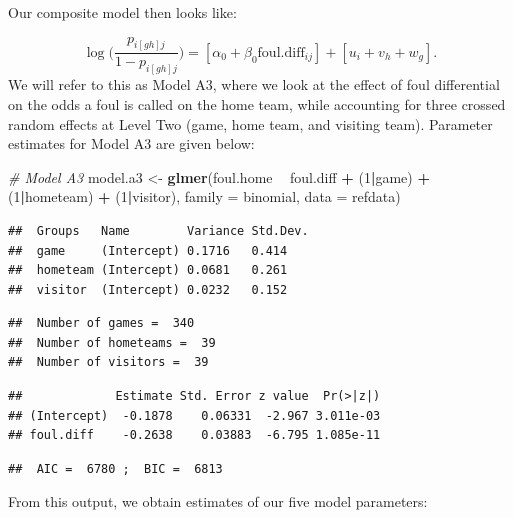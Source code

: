 \documentclass[
]{krantz}
\newenvironment{Shaded}{\begin{snugshade}}{\end{snugshade}}
\newcommand{\CommentTok}[1]{\textcolor[rgb]{0.37,0.37,0.37}{\textit{#1}}}
\newcommand{\DataTypeTok}[1]{\textcolor[rgb]{0.27,0.27,0.27}{#1}}
\newcommand{\DecValTok}[1]{\textcolor[rgb]{0.06,0.06,0.06}{#1}}
\newcommand{\KeywordTok}[1]{\textcolor[rgb]{0.27,0.27,0.27}{\textbf{#1}}}
\newcommand{\NormalTok}[1]{#1}
\newcommand{\OperatorTok}[1]{\textcolor[rgb]{0.43,0.43,0.43}{\textbf{#1}}}
\newcommand{\StringTok}[1]{\textcolor[rgb]{0.5,0.5,0.5}{#1}}
\begin{document}
Our composite model then looks like:

\begin{equation*}
\log\bigg(\frac{p_{i[gh]j}}{1-p_{i[gh]j}}\bigg) = [\alpha_{0}+\beta_{0}\mathrm{foul.diff}_{ij}]+[u_{i}+v_{h}+w_{g}].
\end{equation*}
We will refer to this as Model A3, where we look at the effect of foul differential on the odds a foul is called on the home team, while accounting for three crossed random effects at Level Two (game, home team, and visiting team). Parameter estimates for Model A3 are given below:

\begin{Shaded}
\begin{Highlighting}[]
\CommentTok{# Model A3}
\NormalTok{model.a3 <-}\StringTok{ }\KeywordTok{glmer}\NormalTok{(foul.home }\OperatorTok{~}\StringTok{ }\NormalTok{foul.diff }\OperatorTok{+}\StringTok{ }\NormalTok{(}\DecValTok{1}\OperatorTok{|}\NormalTok{game) }\OperatorTok{+}\StringTok{ }
\StringTok{    }\NormalTok{(}\DecValTok{1}\OperatorTok{|}\NormalTok{hometeam) }\OperatorTok{+}\StringTok{ }\NormalTok{(}\DecValTok{1}\OperatorTok{|}\NormalTok{visitor), }
    \DataTypeTok{family =}\NormalTok{ binomial, }\DataTypeTok{data =}\NormalTok{ refdata)}
\end{Highlighting}
\end{Shaded}

\begin{verbatim}
##  Groups   Name        Variance Std.Dev.
##  game     (Intercept) 0.1716   0.414   
##  hometeam (Intercept) 0.0681   0.261   
##  visitor  (Intercept) 0.0232   0.152
\end{verbatim}

\begin{verbatim}
##  Number of games =  340 
##  Number of hometeams =  39 
##  Number of visitors =  39
\end{verbatim}

\begin{verbatim}
##             Estimate Std. Error z value  Pr(>|z|)
## (Intercept)  -0.1878    0.06331  -2.967 3.011e-03
## foul.diff    -0.2638    0.03883  -6.795 1.085e-11
\end{verbatim}

\begin{verbatim}
##  AIC =  6780 ;  BIC =  6813
\end{verbatim}

From this output, we obtain estimates of our five model parameters:
\end{document}
